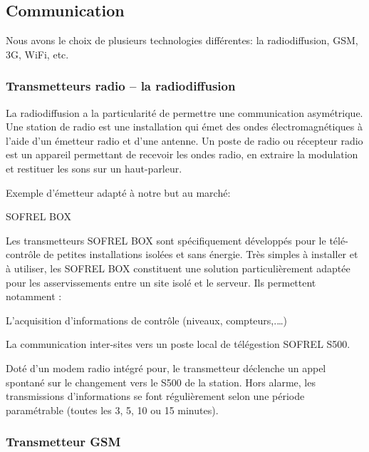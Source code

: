 \subsection{Communication}

Nous avons le choix de plusieurs technologies différentes: la radiodiffusion, GSM, 3G, WiFi, etc.

\subsubsection{Transmetteurs radio – la radiodiffusion}

La radiodiffusion a la particularité de permettre une communication asymétrique. 
Une station de radio est une installation qui émet des ondes électromagnétiques à l'aide d'un émetteur radio et d'une antenne. 
Un poste de radio ou récepteur radio est un appareil permettant de recevoir les ondes radio, en extraire la modulation et restituer les sons sur un haut-parleur. 

Exemple d'émetteur adapté à notre but au marché: 

SOFREL BOX

\begin{figure}
\begin{center}


\end{center}
\end{figure}

Les transmetteurs SOFREL BOX sont spécifiquement développés pour le télé-contrôle de petites installations isolées et sans énergie.
Très simples à installer et à utiliser, les SOFREL BOX constituent une solution particulièrement adaptée pour les asservissements entre un site isolé et le serveur.
Ils permettent notamment :
\begin{description}
\item L’acquisition d’informations de contrôle (niveaux, compteurs,.…)
\item La communication inter-sites vers un poste local de télégestion SOFREL S500.
\end{description}
Doté d’un modem radio intégré pour, le transmetteur déclenche un appel spontané sur le changement vers le S500 de la station.
Hors alarme, les transmissions d’informations se font régulièrement selon une période paramétrable (toutes les 3, 5, 10 ou 15 minutes).

\subsubsection{Transmetteur GSM}

